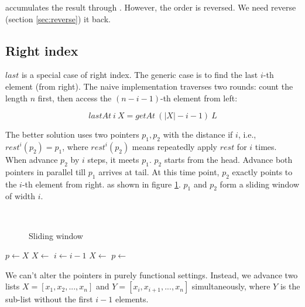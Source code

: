 \documentclass[b5paper]{article}
\begin{document}
 accumulates the result through . However, the order is reversed. We need reverse (section \ref{sec:reverse}) it back.

\subsection{Right index}
 

$last$ is a special case of right index. The generic case is to find the last $i$-th element (from right). The naive implementation traverses two rounds: count the length $n$ first, then access the $(n - i - 1)$-th element from left:

\[
  lastAt\ i\ X = getAt\ (|X| - i - 1)\ L
\]

The better solution uses two pointers $p_1, p_2$ with the distance if $i$, i.e., $rest^i(p_2) = p_1$, where $rest^i(p_2)$ means repeatedly apply $rest$ for $i$ times. When advance $p_2$ by $i$ steps, it meets $p_1$. $p_2$ starts from the head. Advance both pointers in parallel till $p_1$ arrives at tail. At this time point, $p_2$ exactly points to the $i$-th element from right. as shown in figure \ref{fig:list-rindex}. $p_1$ and $p_2$ form a sliding window of width $i$.

\begin{figure}[htbp]
  \centering
   \\
  \caption{Sliding window}
  \label{fig:list-rindex}
\end{figure}

\begin{algorithmic}[1]
  \State $p \gets X$
    \State $X \gets $  
    \State $i \gets i - 1$
  \EndWhile
    \State $X \gets$ 
    \State $p \gets$ 
  \EndWhile
  \State \Return {}
\EndFunction
\end{algorithmic}

We can't alter the pointers in purely functional settings. Instead, we advance two lists $X = [x_1, x_2, ..., x_n]$ and $Y = [x_i, x_{i+1}, ..., x_n]$ simultaneously, where $Y$ is the sub-list without the first $i - 1$ elements.
\end{document}
